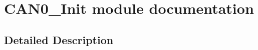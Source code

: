 \hypertarget{group___c_a_n0___init__module}{}\section{C\+A\+N0\+\_\+\+Init module documentation}
\label{group___c_a_n0___init__module}


\subsection{Detailed Description}
